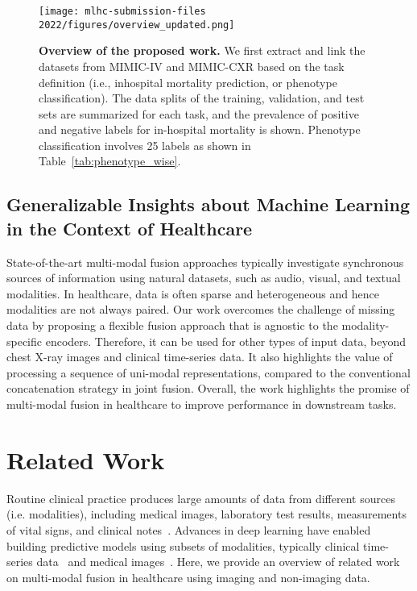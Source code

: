 \documentclass[pmlr]{jmlr}
\begin{document}
\begin{figure}[h!]
    \centering
    \texttt{[image: mlhc-submission-files 2022/figures/overview\_updated.png]} \vspace{-3mm}
    \caption{\small\textbf{Overview of the proposed work.} We first extract and link the datasets from MIMIC-IV and MIMIC-CXR based on the task definition (i.e., inhospital mortality prediction, or phenotype classification). The data splits of the training, validation, and test sets are summarized for each task, and the prevalence of positive and negative labels for in-hospital mortality is shown. Phenotype classification involves 25 labels as shown in Table~\ref{tab:phenotype_wise}.} \vspace{-9mm}
    \label{fig:overview-of-work}
\end{figure} 

\subsection*{Generalizable Insights about Machine Learning in the Context of Healthcare} \vspace{-1mm}
State-of-the-art multi-modal fusion approaches typically investigate synchronous sources of information using natural datasets, such as audio, visual, and textual modalities. In healthcare, data is often sparse and heterogeneous and hence modalities are not always paired. Our work overcomes the challenge of missing data by proposing a flexible fusion approach that is agnostic to the modality-specific encoders. Therefore, it can be used for other types of input data, beyond chest X-ray images and clinical time-series data. It also highlights the value of processing a sequence of uni-modal representations, compared to the conventional concatenation strategy in joint fusion. Overall, the work highlights the promise of multi-modal fusion in healthcare to improve  performance in downstream tasks.





  


\vspace{-0.5mm}
\section{Related Work}

Routine clinical practice produces large amounts of data from different sources (i.e. modalities), including medical images, laboratory test results, measurements of vital signs, and clinical notes~\citep{asri2015big}. Advances in deep learning have enabled building predictive models using subsets of modalities, typically clinical time-series data~\citep{shickel2017deep} and medical images~\citep{litjens2017survey}. Here, we provide an overview of related work on multi-modal fusion in healthcare using imaging and non-imaging data.
\end{document}

